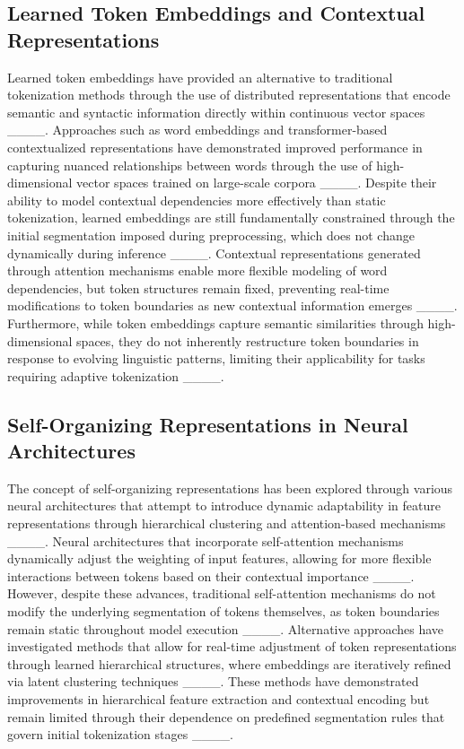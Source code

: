 \subsection{Learned Token Embeddings and Contextual Representations}

Learned token embeddings have provided an alternative to traditional tokenization methods through the use of distributed representations that encode semantic and syntactic information directly within continuous vector spaces ____. Approaches such as word embeddings and transformer-based contextualized representations have demonstrated improved performance in capturing nuanced relationships between words through the use of high-dimensional vector spaces trained on large-scale corpora ____. Despite their ability to model contextual dependencies more effectively than static tokenization, learned embeddings are still fundamentally constrained through the initial segmentation imposed during preprocessing, which does not change dynamically during inference ____. Contextual representations generated through attention mechanisms enable more flexible modeling of word dependencies, but token structures remain fixed, preventing real-time modifications to token boundaries as new contextual information emerges ____. Furthermore, while token embeddings capture semantic similarities through high-dimensional spaces, they do not inherently restructure token boundaries in response to evolving linguistic patterns, limiting their applicability for tasks requiring adaptive tokenization ____.

\subsection{Self-Organizing Representations in Neural Architectures}

The concept of self-organizing representations has been explored through various neural architectures that attempt to introduce dynamic adaptability in feature representations through hierarchical clustering and attention-based mechanisms ____. Neural architectures that incorporate self-attention mechanisms dynamically adjust the weighting of input features, allowing for more flexible interactions between tokens based on their contextual importance ____. However, despite these advances, traditional self-attention mechanisms do not modify the underlying segmentation of tokens themselves, as token boundaries remain static throughout model execution ____. Alternative approaches have investigated methods that allow for real-time adjustment of token representations through learned hierarchical structures, where embeddings are iteratively refined via latent clustering techniques ____. These methods have demonstrated improvements in hierarchical feature extraction and contextual encoding but remain limited through their dependence on predefined segmentation rules that govern initial tokenization stages ____.

